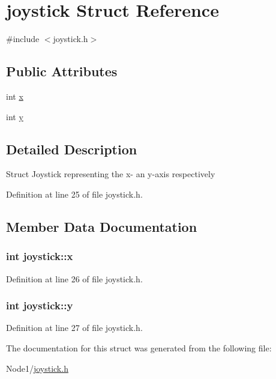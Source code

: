 \hypertarget{structjoystick}{}\section{joystick Struct Reference}
\label{structjoystick}


{\ttfamily \#include $<$joystick.\+h$>$}

\subsection*{Public Attributes}
\begin{DoxyCompactItemize}
\item 
int \hyperlink{structjoystick_aed4380d21fdc18511efe8650eb544333}{x}
\item 
int \hyperlink{structjoystick_a6cb74b7dd7305aa74141b1b05467dd23}{y}
\end{DoxyCompactItemize}


\subsection{Detailed Description}
Struct Joystick representing the x-\/ an y-\/axis respectively 

Definition at line 25 of file joystick.\+h.



\subsection{Member Data Documentation}
\subsubsection[{\texorpdfstring{x}{x}}]{\setlength{\rightskip}{0pt plus 5cm}int joystick\+::x}\hypertarget{structjoystick_aed4380d21fdc18511efe8650eb544333}{}\label{structjoystick_aed4380d21fdc18511efe8650eb544333}


Definition at line 26 of file joystick.\+h.

\subsubsection[{\texorpdfstring{y}{y}}]{\setlength{\rightskip}{0pt plus 5cm}int joystick\+::y}\hypertarget{structjoystick_a6cb74b7dd7305aa74141b1b05467dd23}{}\label{structjoystick_a6cb74b7dd7305aa74141b1b05467dd23}


Definition at line 27 of file joystick.\+h.



The documentation for this struct was generated from the following file\+:\begin{DoxyCompactItemize}
\item 
Node1/\hyperlink{joystick_8h}{joystick.\+h}\end{DoxyCompactItemize}
